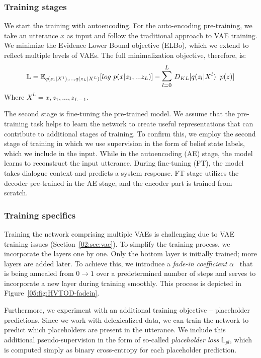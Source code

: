 \subsubsection{Training stages}
We start the training with autoencoding.
For the auto-encoding pre-training, we take an utterance $x$ as input and follow the traditional approach to VAE training.
We minimize the Evidence Lower Bound objective (ELBo), which we extend to reflect multiple levels of VAEs.
The full minimalization objective, therefore, is:
\begin{equation}
    \mathbb{L} = \mathbb{E}_{q(z_1|X^1),...,q(z_L|X^L)}[log~p(x|z_1,...z_L)] - \mathlarger{\mathlarger{\sum}}_{l=0}^L~D_{KL}[q(z_l|X^l)||p(z)]
\end{equation}
Where $X^L = x,z_1,...,z_{L-1}$.

The second stage is fine-tuning the pre-trained model.
We assume that the pre-training task helps to learn the network to create useful representations that can contribute to additional stages of training.
To confirm this, we employ the second stage of training in which we use supervision in the form of belief state labels, which we include in the input.
While in the autoencoding (AE) stage, the model learns to reconstruct the input utterance.
During fine-tuning (FT), the model takes dialogue context and predicts a system response.
FT stage utilizes the decoder pre-trained in the AE stage, and the encoder part is trained from scratch.

\subsubsection{Training specifics}
Training the network comprising multiple VAEs is challenging due to VAE training issues (Section~\ref{02:sec:vae}).
To simplify the training process, we incorporate the layers one by one.
Only the bottom layer is initially trained; more layers are added later.
To achieve this, we introduce a \emph{fade-in coefficient} $\alpha$~\citep{li2020progressive} that is being annealed from $0 \rightarrow 1$ over a predetermined number of steps and serves to incorporate a new layer during training smoothly.
This process is depicted in Figure~\ref{05:fig:HVTOD-fadein}.

Furthermore, we experiment with an additional training objective -- placeholder predictions.
Since we work with delexicalized data, we can train the network to predict which placeholders are present in the utterance.
We include this additional pseudo-supervision in the form of so-called \emph{placeholder loss} $\mathbb{L}_{pl}$, which is computed simply as binary cross-entropy for each placeholder prediction.

